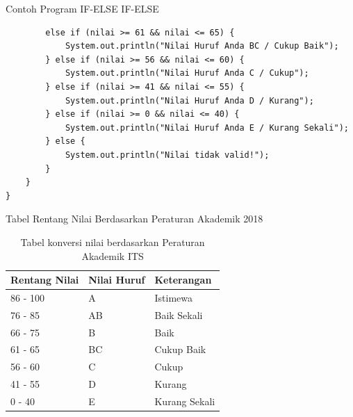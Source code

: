\documentclass{beamer}
\begin{document}
\begin{frame}[fragile]{Contoh Program IF-ELSE IF-ELSE}
\begin{lstlisting}
        else if (nilai >= 61 && nilai <= 65) {
            System.out.println("Nilai Huruf Anda BC / Cukup Baik");
        } else if (nilai >= 56 && nilai <= 60) {
            System.out.println("Nilai Huruf Anda C / Cukup");
        } else if (nilai >= 41 && nilai <= 55) {
            System.out.println("Nilai Huruf Anda D / Kurang");
        } else if (nilai >= 0 && nilai <= 40) {
            System.out.println("Nilai Huruf Anda E / Kurang Sekali");
        } else {
            System.out.println("Nilai tidak valid!");
        }
    }
}
\end{lstlisting}
\end{frame}

\begin{frame}{Tabel Rentang Nilai Berdasarkan Peraturan Akademik 2018}
  \begin{table}
    \footnotesize
    \begin{tabular}{p{}|p{}|p{}}
    \textbf{Rentang Nilai} & \textbf{Nilai Huruf} & \textbf{Keterangan} \\
    \hline
    \rowcolor{lightgray}
    86 - 100 & A & Istimewa \\
    \rowcolor{white}
    76 - 85 & AB & Baik Sekali \\
    \rowcolor{lightgray}
    66 - 75 & B & Baik \\
    \rowcolor{white}
    61 - 65 & BC & Cukup Baik \\
    \rowcolor{lightgray}
    56 - 60 & C & Cukup \\
    \rowcolor{white}
    41 - 55 & D & Kurang \\
    \rowcolor{lightgray}
    0 - 40 & E & Kurang Sekali \\
    \end{tabular}
    \caption{Tabel konversi nilai berdasarkan Peraturan Akademik ITS}
  \end{table}
\end{frame}
\end{document}
